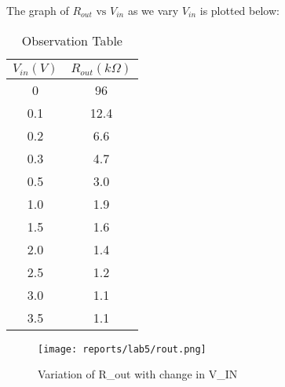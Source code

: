 \documentclass[12pt]{article}
\begin{document}
        The graph of $R_{out} \text{ vs } V_{in}$ as we vary $V_{in}$ is plotted below:\\
        \begin{minipage}{\linewidth}
            \centering
            \begin{minipage}{0.4\linewidth}
                \begin{table}[H]
                    \centering
                    \begin{tabular}{|c|c|}\hline
                        $V_{in}(V)$ & $R_{out}(k\Omega)$\\\hline
                        0	&	96	\\	\hline
                        0.1	&	12.4	\\	\hline
                        0.2	&	6.6	\\	\hline
                        0.3	&	4.7	\\	\hline
                        0.5	&	3.0	\\	\hline
                        1.0	&	1.9	\\	\hline
                        1.5	&	1.6	\\	\hline
                        2.0	&	1.4	\\	\hline
                        2.5	&	1.2	\\	\hline
                        3.0	&	1.1	\\	\hline
                        3.5	&	1.1	\\	\hline
                
                    \end{tabular}
                    \caption{Observation Table}
                    \label{tab:my_label}
                \end{table}
            \end{minipage}
            \hspace{0.02\linewidth}
            \begin{minipage}{0.56\linewidth}
                \begin{figure}[H]
                    \texttt{[image: reports/lab5/rout.png]}
                    \caption{Variation of R_{out} with change in V_{IN}}
                    \label{Va_0_yt}
                \end{figure}
            \end{minipage}
        \end{minipage}
\end{document}
